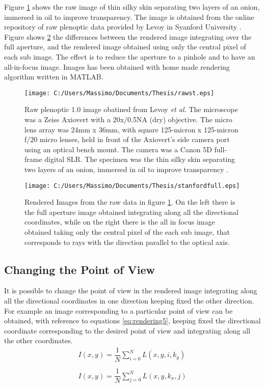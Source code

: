 Figure \ref{fig:rawstanford1} shows the raw image of thin silky skin separating two layers of an onion, immersed in oil to improve transparency. The image is obtained from the online repository of raw plenoptic data provided by Levoy in Syanford University \cite{levoy2006microscope}. 
 Figure shows \ref{fig:stanford1} the differences between the rendered image integrating over the full aperture, and the rendered image obtained using only the central pixel of each sub image. The effect is to reduce the aperture to a pinhole and to have an all-in-focus image.
 Images has been obtained with home made rendering algorithm written in MATLAB.
 \begin{figure}[H]
 	\centering
 	\texttt{[image: C:/Users/Massimo/Documents/Thesis/rawst.eps]}
 	\caption{\label{fig:rawstanford1} Raw plenoptic 1.0 image obatined from Levoy \textit{et al.} The microscope was a Zeiss Axiovert with a 20x/0.5NA (dry) objective. The micro lens array was 24mm x 36mm, with square 125-micron x 125-micron f/20 micro lenses, held in front of the Axiovert's side camera port using an optical bench mount. The camera was a Canon 5D full-frame digital SLR. The specimen was the thin silky skin separating two layers of an onion, immersed in oil to improve transparency \cite{levoy2006microscope}. }
 \end{figure}
\begin{figure}[H]
	\centering
	\texttt{[image: C:/Users/Massimo/Documents/Thesis/stanfordfull.eps]}
	\caption{\label{fig:stanford1}Rendered Images from the raw data in figure \ref{fig:rawstanford1}. On the left there is the full aperture image obtained integrating along all the directional coordinates, while on the right there is the all in focus image obtained taking only the central pixel of the each sub image, that corresponds to rays with the direction parallel to the optical axis.}
\end{figure}
 \subsection{Changing the Point of View}
It is possible to change the point of view in the rendered image integrating along all the directional coordinates in one direction keeping fixed the other direction. For example an image corresponding to a particular point of view can be obtained, with reference to equations \ref{eq:rendering5}, keeping fixed the directional coordinate corresponding to the desired point of view and integrating along all the other coordinates. 
 \begin{equation}
 \label{eq:rendering5}
 \begin{matrix}
 I(x,y)=\dfrac{1}{N}\sum_{i=0}^{N} L(x,y,i,k_y) \\
 \\
 I(x,y)=\dfrac{1}{N}\sum_{j=0}^{N} L(x,y,k_x,j)
 \end{matrix} 
 \end{equation}
